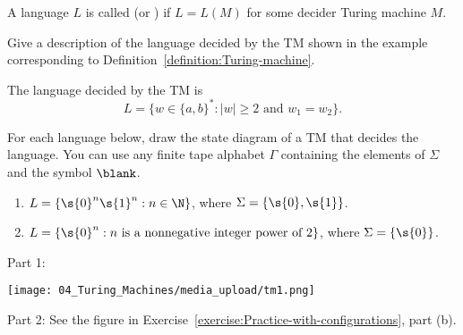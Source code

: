 \begin{definition}
\label{definition:Decidable-language}
A language $L$ is called  (or ) if $L = L(M)$ for some decider Turing machine $M$.

\end{definition}

\begin{exercise}
\label{exercise:A-simple-decidable-language}
Give a description of the language decided by the TM shown in the example corresponding to Definition~\ref{definition:Turing-machine}.

\end{exercise}

\begin{solution}
\label{sol:Turing-Machines::language}
The language decided by the TM is 
\[
    L = \{w \in \{a,b\}^* : |w| \geq 2 \text{ and } w_1 = w_2\}.
\]

\end{solution}

\begin{exercise}
\label{exercise:Drawing-TM-state-diagrams} 
For each language below, draw the state diagram of a TM that decides the language.  You can use any finite tape alphabet $\Gamma$ containing the elements of $\Sigma$ and the symbol $\blank$. 
\begin{enumerate}
    \item $L = \{\s{0}^n\s{1}^n : n \in \N\}$, where $\Sigma = \{\s{0},\s{1}\}$.
    \item $L = \{\s{0}^n : \text{$n$ is a nonnegative integer power of $2$}\}$, where $\Sigma = \{\s{0}\}$.
\end{enumerate}

\end{exercise}

\begin{solution}
\label{sol:Turing-Machines::width}
Part 1:
\begin{center}
    \texttt{[image: 04\_Turing\_Machines/media\_upload/tm1.png]}
\end{center} 
\noindent
Part 2: See the figure in Exercise~\ref{exercise:Practice-with-configurations}, part (b).

\end{solution}

